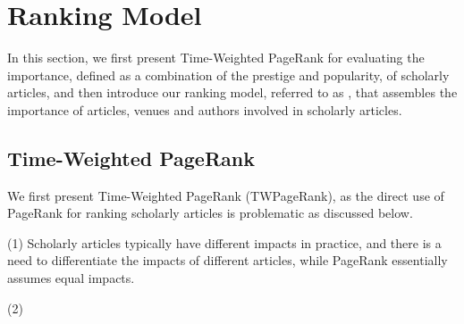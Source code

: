 \section{Ranking Model}
\label{sec-model}

In this section, we first present Time-Weighted PageRank for evaluating  the importance, defined as a combination of the prestige and popularity, of scholarly articles, and then introduce our ranking
model, referred to as \ensemblerank, that assembles the importance of articles, venues and authors involved in scholarly articles.



\subsection{Time-Weighted PageRank}
\label{subsec-twpr}

We first present Time-Weighted PageRank (TWPageRank), as the direct use of PageRank for ranking scholarly articles is problematic as discussed below.







\noindent(1) Scholarly articles typically have different impacts in practice, and there is a need to differentiate the impacts of different articles, while
 PageRank essentially assumes equal impacts.


\noindent(2) 



